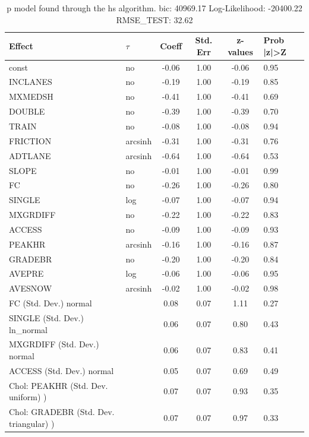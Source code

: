 \begin{table}
	\caption{p model found through the hs algorithm. bic: 40969.17 Log-Likelihood: -20400.22 RMSE_TEST: 32.62}
	\begin{center}
		\begin{tabular}{|l|l|c|c|c|l|}
			\hline
			Effect & $\tau$ & Coeff & Std. Err & z-values & Prob |z|>Z \\
			\hline
			const & no & -0.06 & 1.00 & -0.06 & 0.95 \\
			\hline
			INCLANES & no & -0.19 & 1.00 & -0.19 & 0.85 \\
			\hline
			MXMEDSH & no & -0.41 & 1.00 & -0.41 & 0.69 \\
			\hline
			DOUBLE & no & -0.39 & 1.00 & -0.39 & 0.70 \\
			\hline
			TRAIN & no & -0.08 & 1.00 & -0.08 & 0.94 \\
			\hline
			FRICTION & arcsinh & -0.31 & 1.00 & -0.31 & 0.76 \\
			\hline
			ADTLANE & arcsinh & -0.64 & 1.00 & -0.64 & 0.53 \\
			\hline
			SLOPE & no & -0.01 & 1.00 & -0.01 & 0.99 \\
			\hline
			FC & no & -0.26 & 1.00 & -0.26 & 0.80 \\
			\hline
			SINGLE & log & -0.07 & 1.00 & -0.07 & 0.94 \\
			\hline
			MXGRDIFF & no & -0.22 & 1.00 & -0.22 & 0.83 \\
			\hline
			ACCESS & no & -0.09 & 1.00 & -0.09 & 0.93 \\
			\hline
			PEAKHR & arcsinh & -0.16 & 1.00 & -0.16 & 0.87 \\
			\hline
			GRADEBR & no & -0.20 & 1.00 & -0.20 & 0.84 \\
			\hline
			AVEPRE & log & -0.06 & 1.00 & -0.06 & 0.95 \\
			\hline
			AVESNOW & arcsinh & -0.02 & 1.00 & -0.02 & 0.98 \\
			\hline
			FC (Std. Dev.) normal &  & 0.08 & 0.07 & 1.11 & 0.27 \\
			\hline
			SINGLE (Std. Dev.) ln_normal &  & 0.06 & 0.07 & 0.80 & 0.43 \\
			\hline
			MXGRDIFF (Std. Dev.) normal &  & 0.06 & 0.07 & 0.83 & 0.41 \\
			\hline
			ACCESS (Std. Dev.) normal &  & 0.05 & 0.07 & 0.69 & 0.49 \\
			\hline
			 Chol: PEAKHR (Std. Dev. uniform) ) &  & 0.07 & 0.07 & 0.93 & 0.35 \\
			\hline
			 Chol: GRADEBR (Std. Dev. triangular) ) &  & 0.07 & 0.07 & 0.97 & 0.33 \\

\end{tabular}
\end{center}
\end{table}
